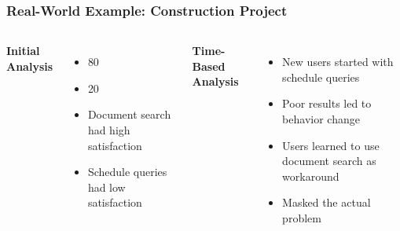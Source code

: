 \begin{frame}
    \frametitle{Real-World Example: Construction Project}
    
    \begin{columns}
        \textbf{Initial Analysis}
        \begin{itemize}
            \item 80%
            \item 20%
            \item Document search had high satisfaction
            \item Schedule queries had low satisfaction
        \end{itemize}
        
        \textbf{Time-Based Analysis}
        \begin{itemize}
            \item New users started with schedule queries
            \item Poor results led to behavior change
            \item Users learned to use document search as workaround
            \item Masked the actual problem
        \end{itemize}
    \end{columns}
    
    \vspace{0.3cm}
    \begin{center}
    \end{center}
\end{frame}

